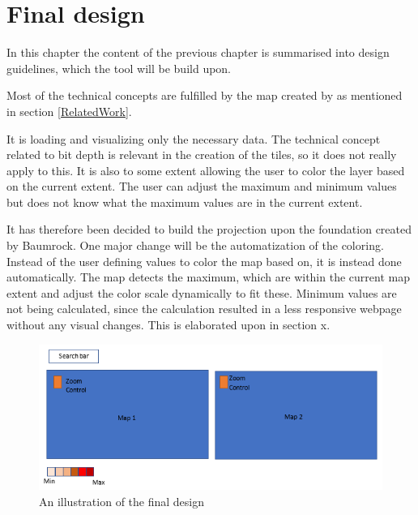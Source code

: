 \chapter{Final design}

In this chapter the content of the previous chapter is summarised into design guidelines, which the tool will be build upon. 


Most of the technical concepts are fulfilled by the map created by \citet{Baumrocks} as mentioned in section \ref{RelatedWork}.

It is loading and visualizing only the necessary data. The technical concept related to bit depth is relevant in the creation of the tiles, so it does not really apply to this. 
It is also to some extent allowing the user to color the layer based on the current extent. The user can adjust the maximum and minimum values but does not know what the maximum values are in the current extent.

It has therefore been decided to build the projection upon the foundation created by Baumrock. One major change will be the automatization of the coloring. Instead of the user defining values to color the map based on, it is instead done automatically. The map detects the maximum, which are within the current map extent and adjust the color scale dynamically to fit these. Minimum values are not being calculated, since the calculation resulted in a less responsive webpage without any visual changes. This is elaborated upon in section x.

\begin{figure} [H]
	\centering
	\includegraphics[width=.8\textwidth]{Pictures/FinalDesign}
	\caption{An illustration of the final design}
	\label{FinalDesignFig}
\end{figure}

